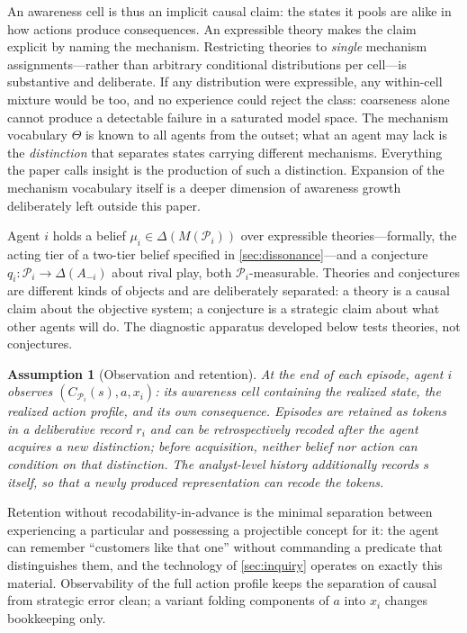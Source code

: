 \documentclass[11pt]{article}
\newtheorem{assumption}{Assumption}[section]
\theoremstyle{definition}
\begin{document}
An awareness cell is thus an implicit causal claim: the states it pools are
alike in how actions produce consequences.  An expressible theory makes the
claim explicit by naming the mechanism.  Restricting theories to
\emph{single} mechanism assignments---rather than arbitrary conditional
distributions per cell---is substantive and deliberate.  If any distribution
were expressible, any within-cell mixture would be too, and no experience
could reject the class: coarseness alone cannot produce a detectable failure
in a saturated model space.  The mechanism vocabulary $\Theta$ is known to
all agents from the outset; what an agent may lack is the \emph{distinction}
that separates states carrying different mechanisms.  Everything the paper
calls insight is the production of such a distinction.  Expansion of the
mechanism vocabulary itself is a deeper dimension of awareness growth
deliberately left outside this paper.

Agent $i$ holds a belief $\mu_i\in\Delta(M(\mathcal P_i))$ over expressible
theories---formally, the acting tier of a two-tier belief specified in
\cref{sec:dissonance}---and a conjecture
$q_i:\mathcal P_i\to\Delta(A_{-i})$ about rival play, both
$\mathcal P_i$-measurable.  Theories and conjectures are different
kinds of objects and are deliberately separated: a theory is a causal claim
about the objective system; a conjecture is a strategic claim about what
other agents will do.  The diagnostic apparatus developed below tests
theories, not conjectures.

\begin{assumption}[Observation and retention]
\label{ass:observation}
At the end of each episode, agent $i$ observes
$(C_{\mathcal P_i}(s),a,x_i)$: its awareness cell containing the realized
state, the realized action profile, and its own consequence.  Episodes are
retained as tokens in a deliberative record $r_i$ and can be retrospectively
recoded after the agent acquires a new distinction; before acquisition,
neither belief nor action can condition on that distinction.  The
analyst-level history additionally records $s$ itself, so that a newly
produced representation can recode the tokens.
\end{assumption}

Retention without recodability-in-advance is the minimal separation between
experiencing a particular and possessing a projectible concept for it: the
agent can remember ``customers like that one'' without commanding a predicate
that distinguishes them, and the technology of \cref{sec:inquiry} operates on
exactly this material.  Observability of the full action profile keeps the
separation of causal from strategic error clean; a variant folding components
of $a$ into $x_i$ changes bookkeeping only.
\end{document}

